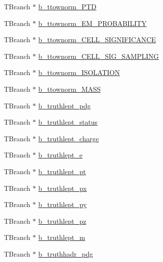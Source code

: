 \begin{DoxyCompactItemize}
\item 
T\+Branch $\ast$ \hyperlink{classXMLWriter_a6c141b63ef50f5c1f36e9fe704c699ea}{b\+\_\+ttownorm\+\_\+\+P\+TD}
\item 
T\+Branch $\ast$ \hyperlink{classXMLWriter_a18e7cacc0e1f4d766316ddf3bd9e04ad}{b\+\_\+ttownorm\+\_\+\+E\+M\+\_\+\+P\+R\+O\+B\+A\+B\+I\+L\+I\+TY}
\item 
T\+Branch $\ast$ \hyperlink{classXMLWriter_a394241e0ebf586bbd264c13af2c66ccb}{b\+\_\+ttownorm\+\_\+\+C\+E\+L\+L\+\_\+\+S\+I\+G\+N\+I\+F\+I\+C\+A\+N\+CE}
\item 
T\+Branch $\ast$ \hyperlink{classXMLWriter_ab6f719207cad12981050b286a4b5200a}{b\+\_\+ttownorm\+\_\+\+C\+E\+L\+L\+\_\+\+S\+I\+G\+\_\+\+S\+A\+M\+P\+L\+I\+NG}
\item 
T\+Branch $\ast$ \hyperlink{classXMLWriter_a0065f656647f9e717d2d2d28ca99b522}{b\+\_\+ttownorm\+\_\+\+I\+S\+O\+L\+A\+T\+I\+ON}
\item 
T\+Branch $\ast$ \hyperlink{classXMLWriter_aecae51497f133e350a0253db8495b0cc}{b\+\_\+ttownorm\+\_\+\+M\+A\+SS}
\item 
T\+Branch $\ast$ \hyperlink{classXMLWriter_af4fced143d11bcc98478df2d22d8aad9}{b\+\_\+truthlept\+\_\+pdg}
\item 
T\+Branch $\ast$ \hyperlink{classXMLWriter_ab814b36f171efc72664322122ff97068}{b\+\_\+truthlept\+\_\+status}
\item 
T\+Branch $\ast$ \hyperlink{classXMLWriter_a86d980d3ec6bceb93d36fa6156699562}{b\+\_\+truthlept\+\_\+charge}
\item 
T\+Branch $\ast$ \hyperlink{classXMLWriter_a141b224e7374382f731c23a8389bcbf1}{b\+\_\+truthlept\+\_\+e}
\item 
T\+Branch $\ast$ \hyperlink{classXMLWriter_aba11f7217adc763d56de50f2f0dfdf36}{b\+\_\+truthlept\+\_\+pt}
\item 
T\+Branch $\ast$ \hyperlink{classXMLWriter_aeeb850c656afa3022ebd409e55ed435d}{b\+\_\+truthlept\+\_\+px}
\item 
T\+Branch $\ast$ \hyperlink{classXMLWriter_ada677b476963cc8cf10bc305ab03ca1a}{b\+\_\+truthlept\+\_\+py}
\item 
T\+Branch $\ast$ \hyperlink{classXMLWriter_a3befc9586a21372fd5c2d568badc1128}{b\+\_\+truthlept\+\_\+pz}
\item 
T\+Branch $\ast$ \hyperlink{classXMLWriter_afae0f06046cd257e0e67201b7fe2ec35}{b\+\_\+truthlept\+\_\+m}
\item 
T\+Branch $\ast$ \hyperlink{classXMLWriter_a4c29743dbb8453d53e4bfb5a4e753c50}{b\+\_\+truthhadr\+\_\+pdg}
\item 

\end{DoxyCompactItemize}
